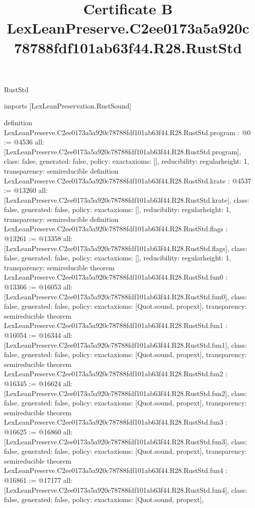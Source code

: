 \begin{lexlean}{RustStd}
\title{Certificate B LexLeanPreserve.C2ee0173a5a920c78788fdf101ab63f44.R28.RustStd}
\begin{coremodule}
imports [LexLeanPreservation.RustSound]

definition LexLeanPreserve.C2ee0173a5a920c78788fdf101ab63f44.R28.RustStd.program : @0 := @4536 {
  all: [LexLeanPreserve.C2ee0173a5a920c78788fdf101ab63f44.R28.RustStd.program],
  class: false,
  generated: false,
  policy: exact{axioms: []},
  reducibility: regular{height: 1},
  transparency: semireducible
}
definition LexLeanPreserve.C2ee0173a5a920c78788fdf101ab63f44.R28.RustStd.krate : @4537 := @13260 {
  all: [LexLeanPreserve.C2ee0173a5a920c78788fdf101ab63f44.R28.RustStd.krate],
  class: false,
  generated: false,
  policy: exact{axioms: []},
  reducibility: regular{height: 1},
  transparency: semireducible
}
definition LexLeanPreserve.C2ee0173a5a920c78788fdf101ab63f44.R28.RustStd.flags : @13261 := @13358 {
  all: [LexLeanPreserve.C2ee0173a5a920c78788fdf101ab63f44.R28.RustStd.flags],
  class: false,
  generated: false,
  policy: exact{axioms: []},
  reducibility: regular{height: 1},
  transparency: semireducible
}
theorem LexLeanPreserve.C2ee0173a5a920c78788fdf101ab63f44.R28.RustStd.fun0 : @13366 := @16053 {
  all: [LexLeanPreserve.C2ee0173a5a920c78788fdf101ab63f44.R28.RustStd.fun0],
  class: false,
  generated: false,
  policy: exact{axioms: [Quot.sound, propext]},
  transparency: semireducible
}
theorem LexLeanPreserve.C2ee0173a5a920c78788fdf101ab63f44.R28.RustStd.fun1 : @16054 := @16344 {
  all: [LexLeanPreserve.C2ee0173a5a920c78788fdf101ab63f44.R28.RustStd.fun1],
  class: false,
  generated: false,
  policy: exact{axioms: [Quot.sound, propext]},
  transparency: semireducible
}
theorem LexLeanPreserve.C2ee0173a5a920c78788fdf101ab63f44.R28.RustStd.fun2 : @16345 := @16624 {
  all: [LexLeanPreserve.C2ee0173a5a920c78788fdf101ab63f44.R28.RustStd.fun2],
  class: false,
  generated: false,
  policy: exact{axioms: [Quot.sound, propext]},
  transparency: semireducible
}
theorem LexLeanPreserve.C2ee0173a5a920c78788fdf101ab63f44.R28.RustStd.fun3 : @16625 := @16860 {
  all: [LexLeanPreserve.C2ee0173a5a920c78788fdf101ab63f44.R28.RustStd.fun3],
  class: false,
  generated: false,
  policy: exact{axioms: [Quot.sound, propext]},
  transparency: semireducible
}
theorem LexLeanPreserve.C2ee0173a5a920c78788fdf101ab63f44.R28.RustStd.fun4 : @16861 := @17177 {
  all: [LexLeanPreserve.C2ee0173a5a920c78788fdf101ab63f44.R28.RustStd.fun4],
  class: false,
  generated: false,
  policy: exact{axioms: [Quot.sound, propext]},
}
\end{coremodule}
\end{lexlean}
